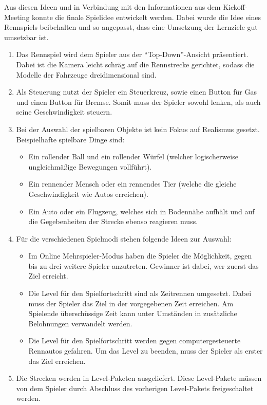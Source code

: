 	Aus diesen Ideen und in Verbindung mit den Informationen aus dem Kickoff-Meeting konnte die finale Spielidee entwickelt werden. Dabei wurde die Idee eines Rennspiels beibehalten und so angepasst, dass eine Umsetzung der Lernziele gut umsetzbar ist.
	\begin{enumerate}
		\item{Das Rennspiel wird dem Spieler aus der \enquote{Top-Down}-Ansicht präsentiert. Dabei ist die Kamera leicht schräg auf die Rennstrecke gerichtet, sodass die Modelle der Fahrzeuge dreidimensional sind.}
		\item{Als Steuerung nutzt der Spieler ein Steuerkreuz, sowie einen Button für Gas und einen Button für Bremse. Somit muss der Spieler sowohl lenken, als auch seine Geschwindigkeit steuern.}
		\item{Bei der Auswahl der spielbaren Objekte ist kein Fokus auf Realismus gesetzt. Beispielhafte spielbare Dinge sind:}
		\begin{itemize}
			\item{Ein rollender Ball und ein rollender Würfel (welcher logischerweise ungleichmäßige Bewegungen vollführt).}
			\item{Ein rennender Mensch oder ein rennendes Tier (welche die gleiche Geschwindigkeit wie Autos erreichen).}
			\item{Ein Auto oder ein Flugzeug, welches sich in Bodennähe aufhält und auf die Gegebenheiten der Strecke ebenso reagieren muss.}
		\end{itemize}
		\item{Für die verschiedenen Spielmodi stehen folgende Ideen zur Auswahl:}
		\begin{itemize}
			\item{Im Online Mehrspieler-Modus haben die Spieler die Möglichkeit, gegen bis zu drei weitere Spieler anzutreten. Gewinner ist dabei, wer zuerst das Ziel erreicht.}
			\item{Die Level für den Spielfortschritt sind als Zeitrennen umgesetzt. Dabei muss der Spieler das Ziel in der vorgegebenen Zeit erreichen. Am Spielende überschüssige Zeit kann unter Umständen in zusätzliche Belohnungen verwandelt werden.}
			\item{Die Level für den Spielfortschritt werden gegen computergesteuerte Rennautos gefahren. Um das Level zu beenden, muss der Spieler als erster das Ziel erreichen.}
		\end{itemize}
		\item{Die Strecken werden in Level-Paketen ausgeliefert. Diese Level-Pakete müssen von dem Spieler durch Abschluss des vorherigen Level-Pakets freigeschaltet werden.}

\end{enumerate}
